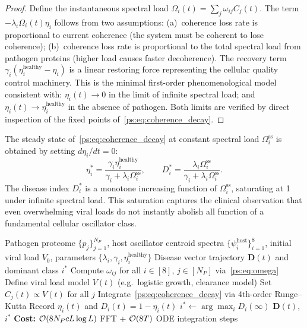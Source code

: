 \begin{proof}
Define the instantaneous spectral load $\Omega_i(t) = \sum_j \omega_{ij} C_j(t)$.
The term $-\lambda_i \Omega_i(t) \eta_i$ follows from two assumptions:
(a)~coherence loss rate is proportional to current coherence (the system must
be coherent to lose coherence); (b)~coherence loss rate is proportional to the
total spectral load from pathogen proteins (higher load causes faster
decoherence). The recovery term $\gamma_i(\eta_i^{\text{healthy}} - \eta_i)$ is
a linear restoring force representing the cellular quality control machinery.
This is the minimal first-order phenomenological model consistent with:
$\eta_i(t) \to 0$ in the limit of infinite spectral load; and
$\eta_i(t) \to \eta_i^{\text{healthy}}$ in the absence of pathogen. Both
limits are verified by direct inspection of the fixed points of~\eqref{ps:eq:coherence_decay}.
\end{proof}

The steady state of~\eqref{ps:eq:coherence_decay} at constant spectral load
$\Omega_i^{\text{ss}}$ is obtained by setting $d\eta_i/dt = 0$:
\begin{equation}
  \eta_i^* = \frac{\gamma_i \eta_i^{\text{healthy}}}{\gamma_i + \lambda_i \Omega_i^{\text{ss}}},
  \qquad
  D_i^* = \frac{\lambda_i \Omega_i^{\text{ss}}}{\gamma_i + \lambda_i \Omega_i^{\text{ss}}}.
  \label{ps:eq:steady_state}
\end{equation}
The disease index $D_i^*$ is a monotone increasing function of $\Omega_i^{\text{ss}}$,
saturating at 1 under infinite spectral load. This saturation captures the
clinical observation that even overwhelming viral loads do not instantly abolish
all function of a fundamental cellular oscillator class.

\begin{algorithm}
\caption{Infection dynamics profiler}
\label{ps:alg:dynamics}
\begin{algorithmic}[1]
\Require Pathogen proteome $\{p_j\}_{j=1}^{N_P}$, host oscillator centroid
  spectra $\{\psi_i^{\text{host}}\}_{i=1}^8$, initial viral load $V_0$,
  parameters $\{\lambda_i, \gamma_i, \eta_i^{\text{healthy}}\}$
\Ensure Disease vector trajectory $\mathbf{D}(t)$ and dominant class $i^*$
\State Compute $\omega_{ij}$ for all $i \in [8]$, $j \in [N_P]$ via~\eqref{ps:eq:omega}
\State Define viral load model $V(t)$ (e.g.\ logistic growth, clearance model)
\State Set $C_j(t) \propto V(t)$ for all $j$
  \State Integrate~\eqref{ps:eq:coherence_decay} via 4th-order Runge--Kutta
  \State Record $\eta_i(t)$ and $D_i(t) = 1 - \eta_i(t)$
\EndFor
\State $i^* \gets \arg\max_i D_i(\infty)$ 
\State \Return $\mathbf{D}(t)$, $i^*$
\State \textbf{Cost:} $\mathcal{O}(8 N_P c L \log L)$ FFT + $\mathcal{O}(8T)$ ODE integration steps
\end{algorithmic}
\end{algorithm}

